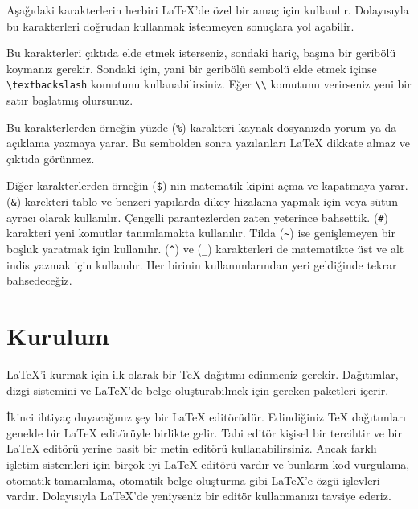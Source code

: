 \documentclass[
  10pt,
]{scrbook}
\newenvironment{Shaded}{\begin{snugshade}}{\end{snugshade}}
\newcommand{\CommentTok}[1]{\textcolor[rgb]{0.56,0.35,0.01}{\textit{#1}}}
\begin{document}
Aşağıdaki karakterlerin herbiri LaTeX'de özel bir amaç için kullanılır.
Dolayısıyla bu karakterleri doğrudan kullanmak istenmeyen sonuçlara yol
açabilir.

\begin{Shaded}
\begin{Highlighting}[]
\CommentTok{\#  $  \%   \&   \{   \}   \textasciitilde{}  \^{}  \_ \textbackslash{}}
\end{Highlighting}
\end{Shaded}

Bu karakterleri çıktıda elde etmek isterseniz, sondaki hariç, başına bir
geribölü koymanız gerekir. Sondaki için, yani bir geribölü sembolü elde
etmek içinse \texttt{\textbackslash{}textbackslash} komutunu kullanabilirsiniz. Eğer \texttt{\textbackslash{}\textbackslash{}}
komutunu verirseniz yeni bir satır başlatmış olursunuz.

Bu karakterlerden örneğin yüzde (\texttt{\%}) karakteri kaynak dosyanızda yorum
ya da açıklama yazmaya yarar. Bu sembolden sonra yazılanları LaTeX
dikkate almaz ve çıktıda görünmez.

Diğer karakterlerden örneğin (\texttt{\$}) nin matematik kipini açma ve
kapatmaya yarar. (\texttt{\&}) karekteri tablo ve benzeri yapılarda dikey
hizalama yapmak için veya sütun ayracı olarak kullanılır. Çengelli
parantezlerden zaten yeterince bahsettik. (\texttt{\#}) karakteri yeni komutlar
tanımlamakta kullanılır. Tilda (\texttt{\textasciitilde{}}) ise genişlemeyen bir boşluk
yaratmak için kullanılır. (\texttt{\^{}}) ve (\texttt{\_}) karakterleri de matematikte üst
ve alt indis yazmak için kullanılır. Her birinin kullanımlarından yeri
geldiğinde tekrar bahsedeceğiz.

\hypertarget{kurulum}{%
\section{Kurulum}\label{kurulum}}

LaTeX'i kurmak için ilk olarak bir TeX dağıtımı edinmeniz gerekir.
Dağıtımlar, dizgi sistemini ve LaTeX'de belge oluşturabilmek için
gereken paketleri içerir.

İkinci ihtiyaç duyacağınız şey bir LaTeX editörüdür. Edindiğiniz TeX
dağıtımları genelde bir LaTeX editörüyle birlikte gelir. Tabi editör
kişisel bir tercihtir ve bir LaTeX editörü yerine basit bir metin
editörü kullanabilirsiniz. Ancak farklı işletim sistemleri için birçok
iyi LaTeX editörü vardır ve bunların kod vurgulama, otomatik tamamlama,
otomatik belge oluşturma gibi LaTeX'e özgü işlevleri vardır. Dolayısıyla
LaTeX'de yeniyseniz bir editör kullanmanızı tavsiye ederiz.
\end{document}
